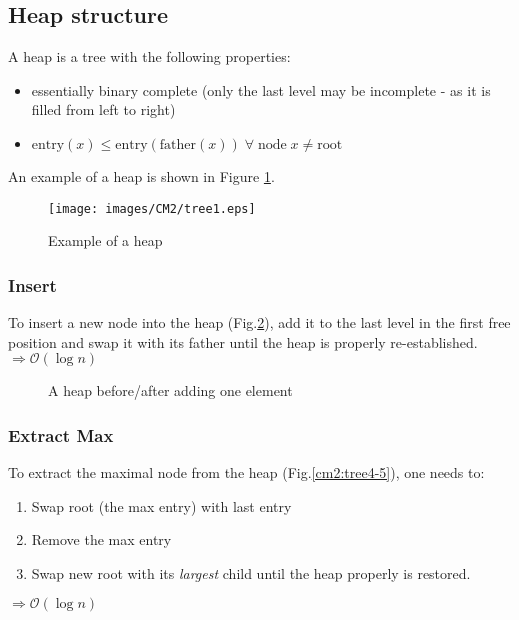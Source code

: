 \subsection{Heap structure}

A heap is a tree with the following properties:
\begin{itemize}
\item essentially binary complete (only the last level may be incomplete - as it is filled from left to right)
\item $\text{entry}(x) \leq \text{entry}(\text{father}(x)) \; \forall \; \text{node} \; x \neq \text{root}$
\end{itemize}
An example of a heap is shown in Figure \ref{cm2:tree1}.

\begin{figure}[h!]
\centering
\texttt{[image: images/CM2/tree1.eps]}
\caption{Example of a heap}
\label{cm2:tree1}
\end{figure}

\subsubsection{Insert} 
To insert a new node into the heap (Fig.\ref{cm2:tree2_3}), add it to the last level in the first free position and swap it with its father until the heap is properly re-established. \newline
$\Rightarrow \mathcal{O}(\log n)$\\

\begin{figure}[htbp]
\centering
{}
\caption{A heap before/after adding one element}
\label{cm2:tree2_3}
\end{figure}

\subsubsection{Extract Max} To extract the maximal node from the heap (Fig.\ref{cm2:tree4-5}), one needs to:
\begin{enumerate}
\item Swap root (the max entry) with last entry
\item Remove the max entry
\item Swap new root with its \emph{largest} child until the heap properly is restored.
\end{enumerate}
$\Rightarrow \mathcal{O}(\log n)$
\\ \\

